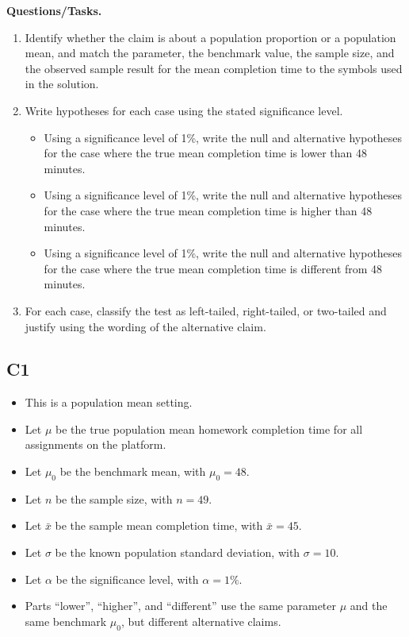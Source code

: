 		\textbf{Questions/Tasks.}
		\begin{enumerate}
			\item[(C1)] Identify whether the claim is about a population proportion or a population mean, and match the parameter, the benchmark value, the sample size, and the observed sample result for the mean completion time to the symbols used in the solution.
			\item[(C2)] Write hypotheses for each case using the stated significance level.
			\begin{itemize}
				\item[(a)] Using a significance level of 1\%, write the null and alternative hypotheses for the case where the true mean completion time is lower than 48 minutes.
				\item[(b)] Using a significance level of 1\%, write the null and alternative hypotheses for the case where the true mean completion time is higher than 48 minutes.
				\item[(c)] Using a significance level of 1\%, write the null and alternative hypotheses for the case where the true mean completion time is different from 48 minutes.
			\end{itemize}
			\item[(C3)] For each case, classify the test as left-tailed, right-tailed, or two-tailed and justify using the wording of the alternative claim.
		\end{enumerate}
		
		\subsection*{C1}
		\begin{itemize}
			\item This is a population mean setting.
			\item Let \(\mu\) be the true population mean homework completion time for all assignments on the platform.
			\item Let \(\mu_0\) be the benchmark mean, with \(\mu_0=48\).
			\item Let \(n\) be the sample size, with \(n=49\).
			\item Let \(\bar{x}\) be the sample mean completion time, with \(\bar{x}=45\).
			\item Let \(\sigma\) be the known population standard deviation, with \(\sigma=10\).
			\item Let \(\alpha\) be the significance level, with \(\alpha=1\%\).
			\item Parts ``lower'', ``higher'', and ``different'' use the same parameter \(\mu\) and the same benchmark \(\mu_0\), but different alternative claims.
		\end{itemize}
		
